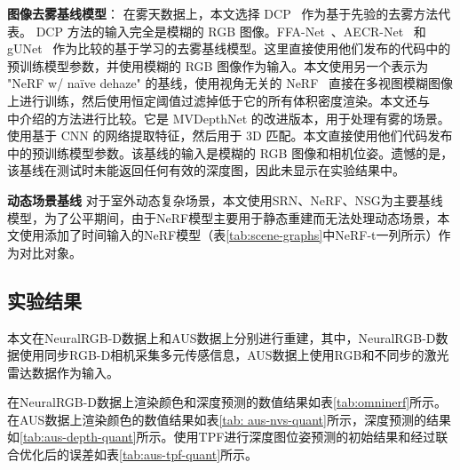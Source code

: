 \textbf{图像去雾基线模型}：
在雾天数据上，本文选择 DCP~\cite{kaiming_he_single_2009} 作为基于先验的去雾方法代表。 DCP 方法的输入完全是模糊的 RGB 图像。FFA-Net~\cite{qin_ffa-net_2020}、AECR-Net~\cite{wu_contrastive_2021} 和 gUNet ~\cite{song_rethinking_2022}作为比较的基于学习的去雾基线模型。这里直接使用他们发布的代码中的预训练模型参数，并使用模糊的 RGB 图像作为输入。本文使用另一个表示为 "NeRF w/ na\"ive dehaze" 的基线，使用视角无关的 NeRF~\cite{mildenhall_nerf_2020} 直接在多视图模糊图像上进行训练，然后使用恒定阈值过滤掉低于它的所有体积密度渲染。本文还与 ~\cite{fujimura_dehazing_2021} 中介绍的方法进行比较。它是 MVDepthNet 的改进版本，用于处理有雾的场景。使用基于 CNN 的网络提取特征，然后用于 3D 匹配。本文直接使用他们代码发布中的预训练模型参数。该基线的输入是模糊的 RGB 图像和相机位姿。遗憾的是，该基线在测试时未能返回任何有效的深度图，因此未显示在实验结果中。

\textbf{动态场景基线}
对于室外动态复杂场景，本文使用SRN\cite{sitzmann2019srns}、NeRF\cite{mildenhall_nerf_2020}、NSG\cite{ost_neural_2021}为主要基线模型，为了公平期间，由于NeRF模型主要用于静态重建而无法处理动态场景，本文使用添加了时间输入的NeRF模型（表\ref{tab:scene-graphs}中NeRF-t一列所示）作为对比对象。

\subsection{实验结果}
本文在NeuralRGB-D数据上和AUS数据上分别进行重建，其中，NeuralRGB-D数据使用同步RGB-D相机采集多元传感信息，AUS数据上使用RGB和不同步的激光雷达数据作为输入。

在NeuralRGB-D数据上渲染颜色和深度预测的数值结果如表\ref{tab:omninerf}所示。在AUS数据上渲染颜色的数值结果如表\ref{tab: aus-nvs-quant}所示，深度预测的结果如\ref{tab:aus-depth-quant}所示。使用TPF进行深度图位姿预测的初始结果和经过联合优化后的误差如表\ref{tab:aus-tpf-quant}所示。

\begin{table}[ht]
\caption{在NeuralRGB-D数据上评估渲染颜色和深度的数值结果}
\label{tab:omninerf}
\centering
{}
\end{table}

